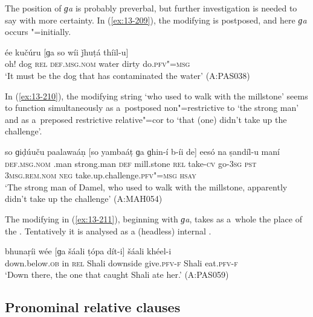 The position of \textit{ɡa} is probably preverbal, but further investigation is needed to say with more certainty. In (\ref{ex:13-209}), the modifying  is postposed, and here \textit{ɡa} occurs "=initially.

\begin{exe}
\ex
\label{ex:13-209}
\gll ée kučúru [ɡa so wíi ǰhuṭá thíil-u]  \\
oh! dog \textsc{rel} \textsc{def.msg.nom} water dirty do.\textsc{pfv"=msg} \\
\glt `It must be the dog that has contaminated the water' (A:PAS038) 
\end{exe}

In (\ref{ex:13-210}), the modifying string `who used to walk with the millstone' seems to function simultaneously as a~postposed non"=restrictive  to `the  strong man' and as a~preposed restrictive relative"=cor to `that (one) didn't take up the challenge'.

\begin{exe}
\ex
\label{ex:13-210}
\gll so ɡiḍúuču paalawaáṇ [so yambaáṭ  ɡa ɡhin-í b-íi de] eesó na  ṣandíl-u maní \\
\textsc{def.msg.nom} .man strong.man \textsc{def} mill.stone \textsc{rel} take-\textsc{cv} go-\textsc{3sg} \textsc{pst} \textsc{3msg.rem.nom} \textsc{neg} take.up.challenge.\textsc{pfv"=msg} \textsc{hsay} \\
\glt `The strong man of Damel, who used to walk with the millstone, apparently didn't take up the
challenge' (A:MAH054)
\end{exe}

The modifying  in (\ref{ex:13-211}), beginning with \textit{ɡa}, takes as a~whole the place of the  . Tentatively it is analysed as a (headless) internal .

\begin{exe}
\ex
\label{ex:13-211}
\gll bhunaṛíi wée [ɡa šáali ṭópa dít-i]  šáali khéel-i \\
down.below.\textsc{ob} in \textsc{rel} Shali downside give.\textsc{pfv-f} Shali eat.\textsc{pfv-f} \\
\glt `Down there, the one that caught Shali ate her.' (A:PAS059)
\end{exe}

\subsection{Pronominal relative clauses}
\label{subsec:13-6-5}


